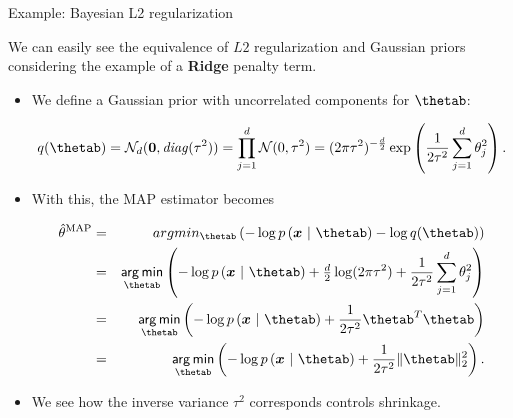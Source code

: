 \begin{vbframe}{Example: Bayesian L2 regularization}

\small We can easily see the equivalence of $L2$ regularization and Gaussian 
priors considering the example of a \textbf{Ridge} penalty term.

\begin{itemize}
  \small
  \item We define a Gaussian prior with uncorrelated components for $\thetab$:
  \begin{footnotesize}
    $$q(\thetab) = \mathcal{N}_d(\bm{0}, \mathit{diag}(\tau^2)) 
    = \prod_{j = 1}^d  \mathcal{N}(0, \tau^2)  
    = (2\pi\tau^2)^{-\frac{d}{2}} \exp \left( \frac{1}{2\tau^2} \sum_{j = 1}^d 
    \theta_j^2 \right).$$
  \end{footnotesize} 
  \item With this, the MAP estimator becomes
  \begin{footnotesize}
  \begin{eqnarray*}
    \thetah^{\text{MAP}} &=& argmin_{\thetab} \left(
    - \log p\left(\xv ~|~ \thetab\right) - \log q(\thetab)
    \right) \\
    &=& \argmin_{\thetab} \left(
    - \log p\left(\xv ~|~ \thetab\right) + \tfrac{d}{2} \log(2\pi \tau^2) +
    \frac{1}{2\tau^2} \sum_{j = 1}^d \theta_j^2
    \right) \\
    &=& \argmin_{\thetab} \left(
    - \log p\left(\xv ~|~ \thetab\right) + \frac{1}{2\tau^2} {\thetab}^T\thetab 
    \right) \\
    &=& \argmin_{\thetab} \left(
    - \log p\left(\xv ~|~ \thetab\right) + \frac{1}{2\tau^2} \| \thetab \|_2^2
    \right).
  \end{eqnarray*}
  \end{footnotesize} 
  \item We see how the inverse variance $\tau^2$ corresponds controls shrinkage.
\end{itemize}
  


\end{vbframe}
